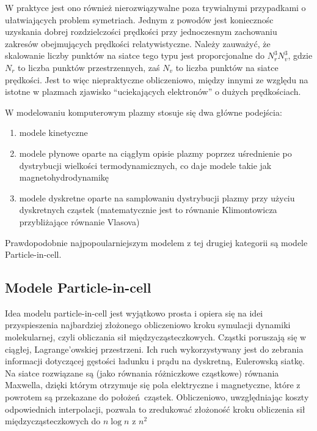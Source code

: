     W praktyce jest ono również nierozwiązywalne poza trywialnymi przypadkami o ułatwiających problem symetriach.
    Jednym z powodów jest koniecznośc uzyskania dobrej rozdzielczości prędkości
    przy jednoczesnym zachowaniu zakresów obejmujących prędkości relatywistyczne. Należy zauważyć, że skalowanie
    liczby punktów na siatce tego typu jest proporcjonalne do $N_r^3 N_v^3$, gdzie $N_r$ to liczba punktów przestrzennych, zaś
    $N_v$ to liczba punktów na siatce prędkości. Jest to więc niepraktyczne
    obliczeniowo, 
    między innymi ze względu na istotne w plazmach zjawisko ``uciekających elektronów'' o dużych prędkościach.


    W modelowaniu komputerowym plazmy stosuje się dwa główne podejścia:
    \begin{enumerate}
        \item modele kinetyczne 
        \item modele płynowe oparte na ciągłym opisie plazmy poprzez uśrednienie po dystrybucji
            wielkości termodynamicznych, co daje modele takie jak magnetohydrodynamikę 
        \item modele dyskretne oparte na samplowaniu dystrybucji plazmy przy użyciu dyskretnych cząstek
            (matematycznie jest to równanie Klimontowicza przybliżające równanie Vlasova) 
    \end{enumerate}

    Prawdopodobnie najpopoularniejszym modelem z tej drugiej kategorii są modele Particle-in-cell.

    \subsection{Modele Particle-in-cell}

    Idea modelu particle-in-cell jest wyjątkowo prosta i opiera się na idei przyspieszenia najbardziej złożonego obliczeniowo kroku
    symulacji dynamiki molekularnej, czyli obliczania sił międzycząsteczkowych. Cząstki poruszają się w ciągłej, Lagrange'owskiej przestrzeni.
    Ich ruch wykorzystywany jest do zebrania informacji dotyczącej gęstości ładunku i prądu na dyskretną, Eulerowską siatkę. Na siatce rozwiązane
    są (jako równania różniczkowe cząstkowe) równania Maxwella, dzięki którym otrzymuje się pola elektryczne i magnetyczne, które z powrotem są przekazane
    do położeń cząstek. Obliczeniowo, uwzględniając koszty odpowiednich interpolacji, pozwala to zredukować złożoność kroku obliczenia sił międzycząsteczkowych
    do $n \log{n}$ z $n^2$ 

